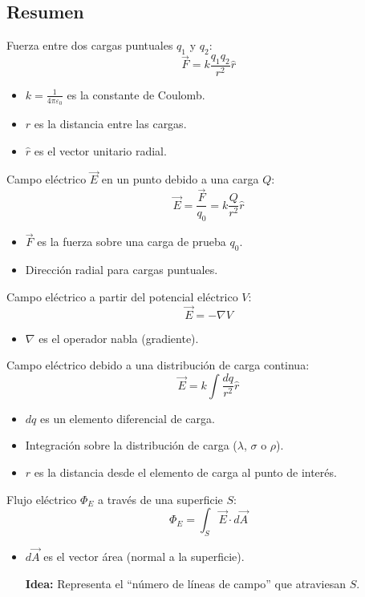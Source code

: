 \subsection{Resumen}

\begin{tcolorbox}[title=Ley de Coulomb]
  Fuerza entre dos cargas puntuales \(q_1\) y \(q_2\):
  \[
    \vec{F} = k \frac{q_1 q_2}{r^2} \hat{r}
  \]
  \begin{itemize}
    \item \(k = \frac{1}{4\pi\varepsilon_0}\) es la constante de Coulomb.
    \item \(r\) es la distancia entre las cargas.
    \item \(\hat{r}\) es el vector unitario radial.
  \end{itemize}
\end{tcolorbox}

\begin{tcolorbox}[title=Campo Eléctrico]
  Campo eléctrico \(\vec{E}\) en un punto debido a una carga \(Q\):
  \[
    \vec{E} = \frac{\vec{F}}{q_0} = k \frac{Q}{r^2} \hat{r}
  \]
  \begin{itemize}
    \item \(\vec{F}\) es la fuerza sobre una carga de prueba \(q_0\).
    \item Dirección radial para cargas puntuales.
  \end{itemize}

  Campo eléctrico a partir del potencial eléctrico \(V\):
  \[
    \vec{E} = -\nabla V
  \]
  \begin{itemize}
    \item \(\nabla\) es el operador nabla (gradiente).
  \end{itemize}
  Campo eléctrico debido a una distribución de carga continua:
  \[
    \vec{E} = k \int \frac{dq}{r^2} \hat{r}
  \]
  \begin{itemize}
    \item \(dq\) es un elemento diferencial de carga.
    \item Integración sobre la distribución de carga (\(\lambda\), \(\sigma\) o \(\rho\)).
    \item \(r\) es la distancia desde el elemento de carga al punto de interés.
  \end{itemize}
\end{tcolorbox}

\begin{tcolorbox}[title=Flujo Eléctrico]
  Flujo eléctrico \(\Phi_E\) a través de una superficie \(S\):
  \[
    \Phi_E = \int_S \vec{E} \cdot d\vec{A}
  \]
  \begin{itemize}
    \item \(d\vec{A}\) es el vector área (normal a la superficie).
    \item[\textbf{Idea:}] Representa el ``número de líneas de campo'' que atraviesan \(S\).
  \end{itemize}  
\end{tcolorbox}

